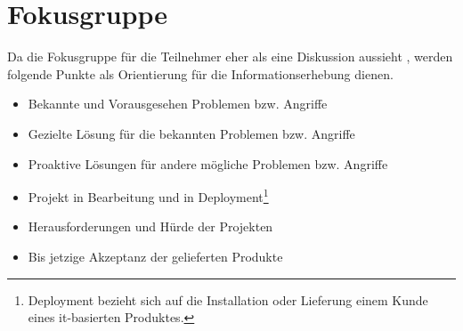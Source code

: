 \section{Fokusgruppe}\label{appendix:focus_gruppe}

Da die Fokusgruppe für die Teilnehmer eher als eine Diskussion aussieht \cite{refbook:APGF}, werden folgende Punkte
als Orientierung für die Informationserhebung dienen.

\begin{itemize}
    \item Bekannte und Vorausgesehen Problemen bzw. Angriffe
    \item Gezielte Lösung für die bekannten Problemen bzw. Angriffe
    \item Proaktive Lösungen für andere mögliche Problemen bzw. Angriffe
    \item Projekt in Bearbeitung und in Deployment\footnote{Deployment bezieht sich auf die Installation oder Lieferung
    einem Kunde eines it-basierten Produktes.}
    \item Herausforderungen und Hürde der Projekten
    \item Bis jetzige Akzeptanz der gelieferten Produkte
\end{itemize}

